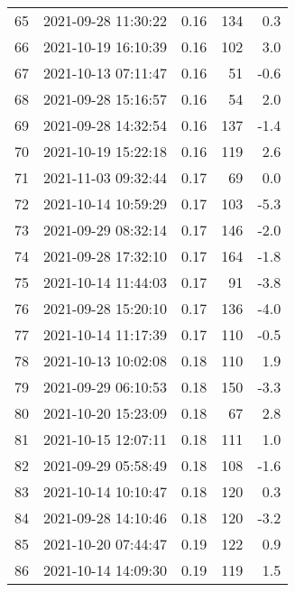 \begin{tabular}{llrrr}
65  & 2021-09-28 11:30:22 &  0.16 &             134 &                    0.3 \\
66  & 2021-10-19 16:10:39 &  0.16 &             102 &                    3.0 \\
67  & 2021-10-13 07:11:47 &  0.16 &              51 &                   -0.6 \\
68  & 2021-09-28 15:16:57 &  0.16 &              54 &                    2.0 \\
69  & 2021-09-28 14:32:54 &  0.16 &             137 &                   -1.4 \\
70  & 2021-10-19 15:22:18 &  0.16 &             119 &                    2.6 \\
71  & 2021-11-03 09:32:44 &  0.17 &              69 &                    0.0 \\
72  & 2021-10-14 10:59:29 &  0.17 &             103 &                   -5.3 \\
73  & 2021-09-29 08:32:14 &  0.17 &             146 &                   -2.0 \\
74  & 2021-09-28 17:32:10 &  0.17 &             164 &                   -1.8 \\
75  & 2021-10-14 11:44:03 &  0.17 &              91 &                   -3.8 \\
76  & 2021-09-28 15:20:10 &  0.17 &             136 &                   -4.0 \\
77  & 2021-10-14 11:17:39 &  0.17 &             110 &                   -0.5 \\
78  & 2021-10-13 10:02:08 &  0.18 &             110 &                    1.9 \\
79  & 2021-09-29 06:10:53 &  0.18 &             150 &                   -3.3 \\
80  & 2021-10-20 15:23:09 &  0.18 &              67 &                    2.8 \\
81  & 2021-10-15 12:07:11 &  0.18 &             111 &                    1.0 \\
82  & 2021-09-29 05:58:49 &  0.18 &             108 &                   -1.6 \\
83  & 2021-10-14 10:10:47 &  0.18 &             120 &                    0.3 \\
84  & 2021-09-28 14:10:46 &  0.18 &             120 &                   -3.2 \\
85  & 2021-10-20 07:44:47 &  0.19 &             122 &                    0.9 \\
86  & 2021-10-14 14:09:30 &  0.19 &             119 &                    1.5 \\

\end{tabular}
